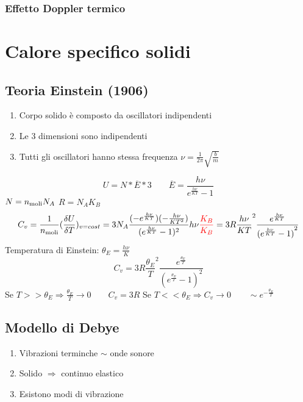 \documentclass[a4paper,11pt]{report}
\begin{document}
	\subsection{Effetto Doppler termico}
	
\chapter{Calore specifico solidi}

\section{Teoria Einstein (1906)}
	\begin{enumerate}
	\item Corpo solido è composto da oscillatori indipendenti
	\item Le 3 dimensioni sono indipendenti
	\item Tutti gli oscillatori hanno stessa frequenza $\nu = \frac{1}{2\pi} \sqrt{\frac{b}{m}}$
	\end{enumerate}
	
	\begin{displaymath}
		U = N * \overline{E} * 3 \qquad \overline{E} = \frac{h\nu}{e^{\frac{h\nu}{KT}}-1}
	\end{displaymath}
	$N = n\textsubscript{moli} N_A$ \qquad $R = N_AK_B$ \newline
	\begin{displaymath}
		C_v = \frac{1}{n\textsubscript{moli}} (\frac{\delta U}{\delta T})_{v=cost} = 3N_A \frac{(-e^{\frac{h\nu}{KT}})(-\frac{h\nu}{KT^2})}{(e^{\frac{h\nu}{KT}}-1)^2}h\nu \textcolor{red}{\frac{K_B}{K_B}} = 3R {\frac{h\nu}{KT}}^2\frac{e^{\frac{h\nu}{KT}}}{{(e^{\frac{h\nu}{KT}}-1)}^2}
	\end{displaymath}
	Temperatura di Einstein: \qquad $\theta_E = \frac{h\nu}{K}$
	\begin{equation}
		C_v = 3R {\frac{\theta_E}{T}}^2\frac{e^{\frac{\theta_E}{T}}}{{(e^{\frac{\theta_E}{T}}-1)}^2}
	\end{equation}
	Se $T >> \theta_E \Rightarrow \frac{\theta_E}{T} \to 0 \qquad C_v = 3R$  \newline
	Se $T << \theta_E \Rightarrow C_v \to 0 \qquad \sim e^{-\frac{\theta_E}{T}}$

\section{Modello di Debye}
	\begin{enumerate}
		\item Vibrazioni terminche $\sim$ onde sonore
		\item Solido $\Rightarrow$ continuo elastico
		\item Esistono modi di vibrazione
	\end{enumerate}
\end{document}
